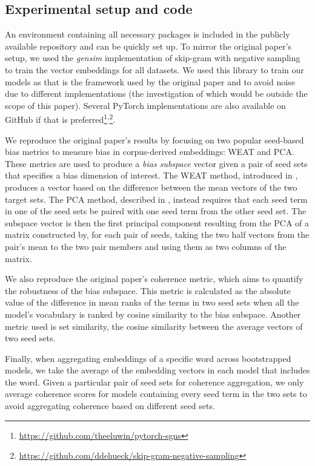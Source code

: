\subsection{\label{sec:calc_agg}Experimental setup and code} An environment containing all necessary
packages is included in the publicly available repository and can be quickly set up. To mirror the
original paper's setup, we used the \emph{gensim} \citep{rehurek2010software} implementation of
skip-gram with negative sampling \citep{mikolov2013distributed} to train the vector embeddings for
all datasets. We used this library to train our models as that is the framework used by the original
paper and to avoid noise due to different implementations (the investigation of which would be
outside the scope of this paper). Several PyTorch \citep{pytorch} implementations are also available
on GitHub if that is
preferred\footnote{\href{https://github.com/theeluwin/pytorch-sgns}{https://github.com/theeluwin/pytorch-sgns}}\textsuperscript{,}\footnote{\href{https://github.com/ddehueck/skip-gram-negative-sampling}{https://github.com/ddehueck/skip-gram-negative-sampling}}.

We reproduce the original paper's results by focusing on two popular seed-based bias metrics to
measure bias in corpus-derived embeddings: WEAT and PCA. These metrics are used to produce
a \emph{bias subspace} vector given a pair of seed sets that specifies a bias dimension of interest.
The WEAT method, introduced in \citet{caliskan_semantics_2017}, produces a vector based on the
difference between the mean vectors of the two target sets. The PCA method, described in
\citet{bolukbasi_man_2016}, instead requires that each seed term in one of the seed sets be paired
with one seed term from the other seed set. The subspace vector is then the first principal
component resulting from the PCA of a matrix constructed by, for each pair of seeds, taking the two
half vectors from the pair's mean to the two pair members and using them as two columns of the
matrix.

We also reproduce the original paper's coherence metric, which aims to quantify the robustness of
the bias subspace. This metric is calculated as the absolute value of the difference in mean ranks
of the terms in two seed sets when all the model's vocabulary is ranked by cosine similarity to the
bias subspace. Another metric used is set similarity, the cosine similarity between the average
vectors of two seed sets.

Finally, when aggregating embeddings of a specific word across bootstrapped models, we take the
average of the embedding vectors in each model that includes the word. Given a particular pair of
seed sets for coherence aggregation, we only average coherence scores for models containing every
seed term in the two sets to avoid aggregating coherence based on different seed sets.

